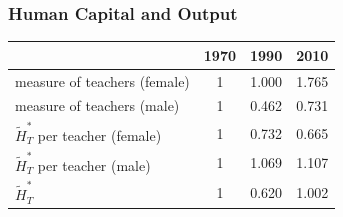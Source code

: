 \documentclass[11pt]{beamer}
\begin{document}

\begin{frame}
\frametitle{Human Capital and Output}

\begin{table}
  \centering \begin{tabular}{lccc}
\toprule
& 1970 & 1990 & 2010 \\
\midrule
measure of teachers (female) & 1 & 1.000 & 1.765\\
measure of teachers (male) & 1 & 0.462 & 0.731\\
$\widetilde{H}_T^*$ per teacher (female)   & 1 & 0.732 & 0.665 \\
$\widetilde{H}_T^*$ per teacher (male)   & 1 & 1.069 & 1.107 \\
$\widetilde{H}_T^*$ & 1  & 0.620 & 1.002 \\
\bottomrule
\end{tabular}
  \label{ }
\end{table}
%


\end{frame}
\end{document}
